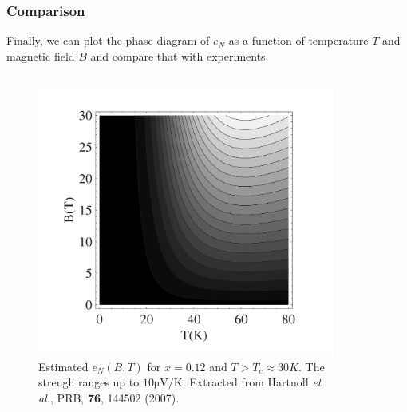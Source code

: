 \documentclass[10pt,aspectratio=43,xcolor=x11names,t]{beamer}%
\begin{document}
		\begin{frame}\frametitle{Comparison}
			Finally, we can plot the phase diagram of $e_N$ as a function of temperature $T$ and magnetic field $B$ and compare that with experiments
			\vspace{-1em}
			\begin{columns}
				\begin{column}{0.45\textwidth}
					\begin{figure}[!htp]
						\centering
						\vspace{-1em}
						\includegraphics[scale=0.65]{eN.png}
						\caption{Estimated $e_N(B,T)$ for $x=0.12$ and $T>T_c\approx30K$. The strengh ranges up to $10\mathrm{\mu V/K}$. Extracted from {\scriptsize Hartnoll \textit{et al.}, PRB, \textbf{76}, 144502 (2007)}.}
					\end{figure}
				\end{column}
				\begin{column}{0.45\textwidth}
					\begin{figure}[!htp]
						\centering

\end{figure}
\end{column}
\end{columns}
\end{frame}
\end{document}
